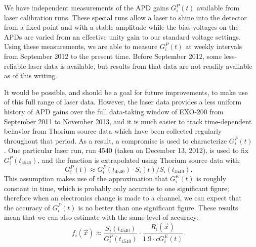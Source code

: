 We have independent measurements of the APD gains $G^P_i(t)$ available from laser calibration runs.  These special runs allow a laser to shine into the detector from a fixed point and with a stable amplitude while the bias voltages on the APDs are varied from an effective unity gain to our standard voltage settings.  Using these measurements, we are able to measure $G^P_i(t)$ at weekly intervals from September 2012 to the present time.  Before September 2012, some less-reliable laser data is available, but results from that data are not readily available as of this writing.

It would be possible, and should be a goal for future improvements, to make use of this full range of laser data.  However, the laser data provides a less uniform history of APD gains over the full data-taking window of EXO-200 from September 2011 to November 2013, and it is much easier to track time-dependent behavior from Thorium source data which have been collected regularly throughout that period.  As a result, a compromise is used to characterize $G^P_i(t)$.  One particular laser run, run 4540 (taken on December 13, 2012), is used to fix $G^P_i(t_{4540})$, and the function is extrapolated using Thorium source data with:
\begin{equation}
G^P_i(t) \approx G^P_i(t_{4540}) \cdot S_i(t)/S_i(t_{4540}).
\end{equation}
This assumption makes use of the approximation that $G^E_i(t)$ is roughly constant in time, which is probably only accurate to one significant figure; therefore when an electronics change is made to a channel, we can expect that the accuracy of $G^P_i(t)$ is no better than one significant figure.  These results mean that we can also estimate with the same level of accuracy:
\begin{equation}
f_i(\vec{x}) \approx \frac{S_i(t_{4540})}{G^P_i(t_{4540})} \cdot \frac{R_i(\vec{x})}{1.9 \cdot c G^E_i(t)}.
\end{equation}

